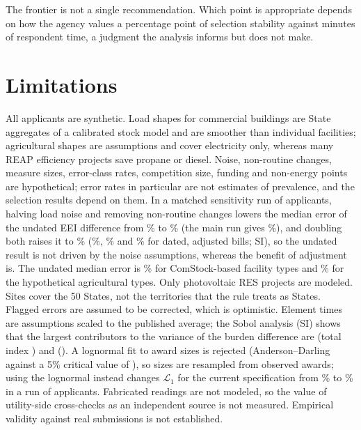 \documentclass[preprint,12pt]{elsarticle}
\begin{document}
The frontier is not a single recommendation. Which point is appropriate depends on how
the agency values a percentage point of selection stability against minutes of
respondent time, a judgment the analysis informs but does not make.

\section{Limitations}

All applicants are synthetic. Load shapes for commercial buildings are State aggregates
of a calibrated stock model and are smoother than individual facilities; agricultural
shapes are assumptions and cover electricity only, whereas many REAP efficiency projects
save propane or diesel. Noise, non-routine changes, measure sizes, error-class rates,
competition size, funding and non-energy points are hypothetical; error rates in
particular are not estimates of prevalence, and the selection results depend on them.
In a matched sensitivity run of \SizeSensN{} applicants, halving load noise and removing
non-routine changes lowers the median error of the undated EEI difference from
\NoiseCentralUndatedExact\% to \NoiseLowUndatedExact\% (the main run gives
\PathUndatedNormalMedian\%), and doubling both raises it to \NoiseHighUndatedExact\% (\NoiseLowNormMedian\%,
\NoiseCentralNormMedian\% and \NoiseHighNormMedian\% for dated, adjusted bills; SI), so the
undated result is not driven by the noise assumptions, whereas the benefit of adjustment
is. The undated median error is \BasisComstockUndatedMedian\% for ComStock-based facility
types and \BasisHypotheticalUndatedMedian\% for the hypothetical agricultural types.
Only photovoltaic RES projects are modeled. Sites cover the 50 States, not the
territories that the rule treats as States. Flagged errors are assumed to be corrected,
which is optimistic. Element times are assumptions scaled to the published average; the
Sobol analysis (SI) shows that the largest contributors to the variance of the burden
difference are \SobolTopName{} (total index \SobolTopST) and \SobolSecondName{}
(\SobolSecondST). A lognormal fit to award sizes is rejected
(Anderson--Darling \AwardFitADRes{} against a 5\% critical value of
\AwardFitADCritical), so sizes are resampled from observed awards; using the lognormal
instead changes $\mathcal{L}_1$ for the current specification from \SizeEmpCurrentMare\%
to \SizeLognCurrentMare\% in a run of \SizeSensN{} applicants. Fabricated readings are not
modeled, so the value of utility-side cross-checks as an independent source is not
measured. Empirical validity against real submissions is not established.
\end{document}
